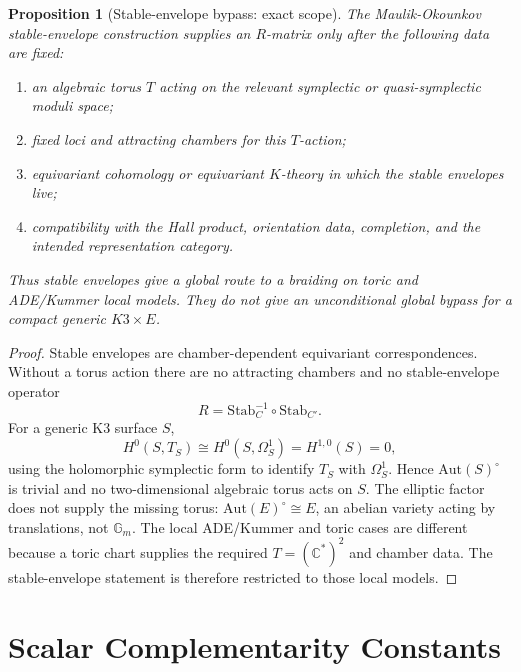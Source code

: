 \documentclass[11pt]{amsart}
\newtheorem{prop}[thm]{Proposition}
\theoremstyle{definition}
\newcommand{\C}{\mathbb C}
\newcommand{\Gm}{\mathbb G_m}
\newcommand{\Stab}{\mathrm{Stab}}
\begin{document}
\begin{prop}[Stable-envelope bypass: exact scope]
\label{prop:stable-envelope-scope}
The Maulik-Okounkov stable-envelope construction supplies an $R$-matrix
only after the following data are fixed:
\begin{enumerate}[label=\textup{(\roman*)}]
\item an algebraic torus $T$ acting on the relevant symplectic or
quasi-symplectic moduli space;
\item fixed loci and attracting chambers for this $T$-action;
\item equivariant cohomology or equivariant $K$-theory in which the
stable envelopes live;
\item compatibility with the Hall product, orientation data, completion,
and the intended representation category.
\end{enumerate}
Thus stable envelopes give a global route to a braiding on toric and
ADE/Kummer local models.  They do not give an unconditional global
bypass for a compact generic $K3\times E$.
\end{prop}

\begin{proof}
Stable envelopes are chamber-dependent equivariant correspondences.
Without a torus action there are no attracting chambers and no
stable-envelope operator
\[
  R=\Stab_C^{-1}\circ \Stab_{C'}.
\]
For a generic K3 surface $S$,
\[
  H^0(S,T_S)\cong H^0(S,\Omega^1_S)=H^{1,0}(S)=0,
\]
using the holomorphic symplectic form to identify $T_S$ with
$\Omega^1_S$.  Hence $\mathrm{Aut}(S)^\circ$ is trivial and no
two-dimensional algebraic torus acts on $S$.  The elliptic factor does
not supply the missing torus: $\mathrm{Aut}(E)^\circ\cong E$, an
abelian variety acting by translations, not $\Gm$.  The local
ADE/Kummer and toric cases are different because a toric chart supplies
the required $T=(\C^*)^2$ and chamber data.  The stable-envelope
statement is therefore restricted to those local models.
\end{proof}

\section{Scalar Complementarity Constants}
\label{sec:scalar-complementarity}
\end{document}
